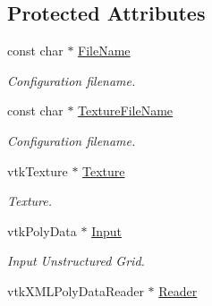 \subsection*{Protected Attributes}
\begin{DoxyCompactItemize}
\item 
\hypertarget{classvtkOrgan_ac507b85e8e446dc2b05f8eddd19653b5}{
const char $\ast$ \hyperlink{classvtkOrgan_ac507b85e8e446dc2b05f8eddd19653b5}{FileName}}
\label{classvtkOrgan_ac507b85e8e446dc2b05f8eddd19653b5}

\begin{DoxyCompactList}\small\item\em Configuration filename. \item\end{DoxyCompactList}\item 
\hypertarget{classvtkOrgan_a5ba85412383cd85fd110823131dd2c5d}{
const char $\ast$ \hyperlink{classvtkOrgan_a5ba85412383cd85fd110823131dd2c5d}{TextureFileName}}
\label{classvtkOrgan_a5ba85412383cd85fd110823131dd2c5d}

\begin{DoxyCompactList}\small\item\em Configuration filename. \item\end{DoxyCompactList}\item 
\hypertarget{classvtkOrgan_a77f4c261f73869b78984aff6f5597275}{
vtkTexture $\ast$ \hyperlink{classvtkOrgan_a77f4c261f73869b78984aff6f5597275}{Texture}}
\label{classvtkOrgan_a77f4c261f73869b78984aff6f5597275}

\begin{DoxyCompactList}\small\item\em Texture. \item\end{DoxyCompactList}\item 
\hypertarget{classvtkOrgan_aae878db5d8184027daa106b00b9f4e18}{
vtkPolyData $\ast$ \hyperlink{classvtkOrgan_aae878db5d8184027daa106b00b9f4e18}{Input}}
\label{classvtkOrgan_aae878db5d8184027daa106b00b9f4e18}

\begin{DoxyCompactList}\small\item\em Input Unstructured Grid. \item\end{DoxyCompactList}\item 
\hypertarget{classvtkOrgan_ae9fcd44b733e1a685e7c900216b4f40f}{
vtkXMLPolyDataReader $\ast$ \hyperlink{classvtkOrgan_ae9fcd44b733e1a685e7c900216b4f40f}{Reader}}
\label{classvtkOrgan_ae9fcd44b733e1a685e7c900216b4f40f}


\end{DoxyCompactItemize}
